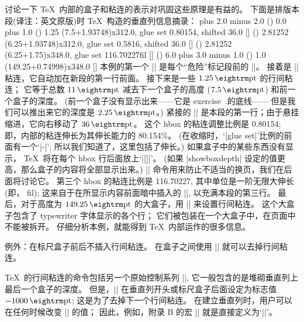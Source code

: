 \danger 讨论一下 \TeX\ 内部的盒子和粘连的表示对巩固这些原理是有益的。%
下面是排版本段(译注：英文原\hbox{版)}时 \TeX\ 构造的垂直列信息摘录：
\begintt
{} plus 2.0 minus 2.0
\glue(\parskip) 0.0 plus 1.0
\glue(\baselineskip) 1.25
\hbox(7.5+1.93748)x312.0, glue set 0.80154, shifted 36.0 []
\glue(\baselineskip) 2.81252
\hbox(6.25+1.93748)x312.0, glue set 0.5816, shifted 36.0 []
\glue(\baselineskip) 2.81252
\hbox(6.25+1.75)x348.0, glue set 116.70227fil []
\glue(\abovedisplayskip) 6.0 plus 3.0 minus 1.0
\glue(\lineskip) 1.0
\hbox(149.25+0.74998)x348.0 []
\endtt
本例的第一个 |\glue| 是每个``危险''标记段前的 |\medskip|。%
接着是 |\parskip| 粘连，它自动加在新段的第一行前面。%
接下来是一些 $1.25\pt$ 的行间粘连；
它等于总数 $11\pt$ 减去下一个盒子的高度 ($7.5\pt$) 和前一个盒子的深度。%
(前一个盒子没有显示出来——它是 exercise~\chapno.\the\exno 的底线——%
但是我们可以推出来它的深度是 $2.25\pt$。)
紧接的 |\hbox| 是本段的第一行；由于悬挂缩进，它向右移动了 $36\pt$。%
这个 hbox 的粘连调整比例是 0.80154; 即，内部的粘连伸长为其伸长能力的 80.154\%。%
(在收缩时，`|glue set|'比例的前面有一个`|-|';
所以我们知道了，这里包括了伸长。)
如果盒子中的某些东西没有显示， \TeX\ 将在每个 hbox 行后面放上`|[]|'。%
(如果 |showboxdepth| 设定的值更高，那么盒子的内容将全部显示出来。)
|\penalty| 命令用来防止不适当的换页，我们在后面将讨论它。%
第三个 hbox 的粘连比例是 116.70227, 其中单位是一阶无限大伸长(\hbox{即，} fil);
这来自于在所显示内容前面暗中插入的 |\hfil|, 以充满本段的第三行。%
最后，对于高度为 $149.25\pt$ 的大盒子，用 |\lineskip| 来设置行间粘连。%
这个大盒子包含了 typewriter 字体显示的各个行；
它们被包装在一个大盒子中，在页面中不能被拆开。%
仔细分析本例，就能得到 \TeX\ 内部运作的很多信息。

\danger 例外：在标尺盒子前后不插入行间粘连。%
在盒子之间使用 |\nointerlineskip| 就可以去掉行间粘连。

\ddanger \TeX\ 的行间粘连的命令包括另一个原始控制系列 |\prevdepth|,
它一般包含的是堆砌垂直列上最后一个盒子的深度。%
但是，|\prevdepth| 在垂直列开头或标尺盒子后面设定为标志值 $-1000\pt$;
\1这是为了去掉下一个行间粘连。%
在建立垂直列时，用户可以在任何时候改变 |\prevdepth| 的值；
因此，例如，附录 B 的宏 |\nointerlineskip| 就是直接定义为`|\prevdepth=-1000pt|'。

